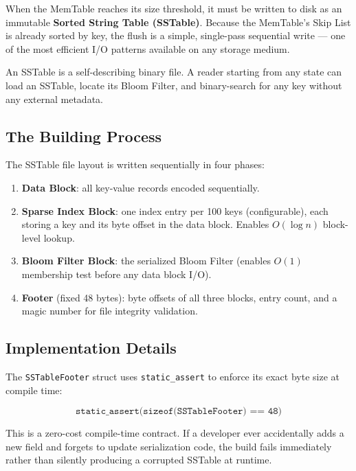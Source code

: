 \documentclass[11pt,a4paper]{article}
\begin{document}
When the MemTable reaches its size threshold, it must be written to disk as an
immutable \textbf{Sorted String Table (SSTable)}. Because the MemTable's Skip
List is already sorted by key, the flush is a simple, single-pass sequential
write --- one of the most efficient I/O patterns available on any storage medium.

An SSTable is a self-describing binary file. A reader starting from any state
can load an SSTable, locate its Bloom Filter, and binary-search for any key
without any external metadata.

\subsection{The Building Process}

The SSTable file layout is written sequentially in four phases:
\begin{enumerate}[noitemsep]
    \item \textbf{Data Block}: all key-value records encoded sequentially.
    \item \textbf{Sparse Index Block}: one index entry per 100 keys (configurable), each storing a key and its byte offset in the data block. Enables $O(\log n)$ block-level lookup.
    \item \textbf{Bloom Filter Block}: the serialized Bloom Filter (enables $O(1)$ membership test before any data block I/O).
    \item \textbf{Footer} (fixed 48 bytes): byte offsets of all three blocks, entry count, and a magic number for file integrity validation.
\end{enumerate}

\subsection{Implementation Details}

The \texttt{SSTableFooter} struct uses \texttt{static\_assert} to enforce its
exact byte size at compile time:

\begin{equation*}
    \texttt{static\_assert(sizeof(SSTableFooter) == 48)}
\end{equation*}

This is a zero-cost compile-time contract. If a developer ever accidentally
adds a new field and forgets to update serialization code, the build fails
immediately rather than silently producing a corrupted SSTable at runtime.
\end{document}
